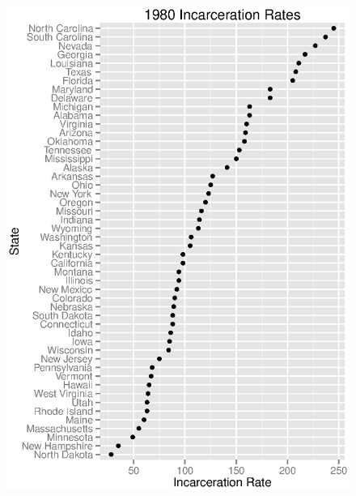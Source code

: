 \documentclass{exam}
\begin{document}
  \begin{figure}[H]
    \centering
    \includegraphics[scale = 0.9]{rates_1980.eps}
  \end{figure}
\end{document}
